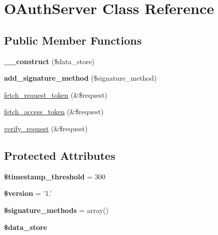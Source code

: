 \hypertarget{class_o_auth_server}{\section{O\-Auth\-Server Class Reference}
\label{class_o_auth_server}
}
\subsection*{Public Member Functions}
\begin{DoxyCompactItemize}
\item 
\hypertarget{class_o_auth_server_a33c43e75f9b14f31937f100937c8fbe2}{{\bfseries \-\_\-\-\_\-construct} (\$data\-\_\-store)}\label{class_o_auth_server_a33c43e75f9b14f31937f100937c8fbe2}

\item 
\hypertarget{class_o_auth_server_a170054e7eaa6327ad574751834b3facc}{{\bfseries add\-\_\-signature\-\_\-method} (\$signature\-\_\-method)}\label{class_o_auth_server_a170054e7eaa6327ad574751834b3facc}

\item 
\hyperlink{class_o_auth_server_aa91f1a763ab36c576ebf9319ac4751f6}{fetch\-\_\-request\-\_\-token} (\&\$request)
\item 
\hyperlink{class_o_auth_server_a5c76359726e685013d2e0cb8a1abe09a}{fetch\-\_\-access\-\_\-token} (\&\$request)
\item 
\hyperlink{class_o_auth_server_ad31e95096adeac980a8a99f59c4cadc6}{verify\-\_\-request} (\&\$request)
\end{DoxyCompactItemize}
\subsection*{Protected Attributes}
\begin{DoxyCompactItemize}
\item 
\hypertarget{class_o_auth_server_a7a961e8db8828a95c87c3644a89da2dd}{{\bfseries \$timestamp\-\_\-threshold} = 300}\label{class_o_auth_server_a7a961e8db8828a95c87c3644a89da2dd}

\item 
\hypertarget{class_o_auth_server_a46a6aa43e20d9c9bb8bc064d66c53988}{{\bfseries \$version} = '1.'}\label{class_o_auth_server_a46a6aa43e20d9c9bb8bc064d66c53988}

\item 
\hypertarget{class_o_auth_server_a0e439c47a6b0f7f05ded208d97d49142}{{\bfseries \$signature\-\_\-methods} = array()}\label{class_o_auth_server_a0e439c47a6b0f7f05ded208d97d49142}

\item 
\hypertarget{class_o_auth_server_a7349d989fe930088b46a100fdf374115}{{\bfseries \$data\-\_\-store}}\label{class_o_auth_server_a7349d989fe930088b46a100fdf374115}

\end{DoxyCompactItemize}


